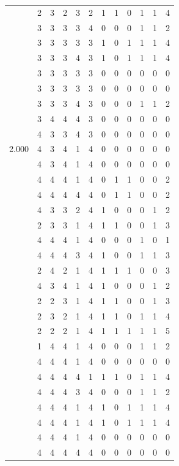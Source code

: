 \documentclass[]{msu-thesis}
\theoremstyle{definition}
\theoremstyle{definition}
\theoremstyle{definition}
\theoremstyle{remark}
\begin{document}
\begin{table}
{\begin{tabular}[t]{rrrrrrrrrrrr}
 & 2 & 3 & 2 & 3 & 2 & 1 & 1 & 0 & 1 & 1 & 4\\
 & 3 & 3 & 3 & 3 & 4 & 0 & 0 & 0 & 1 & 1 & 2\\
 & 3 & 3 & 3 & 3 & 3 & 1 & 0 & 1 & 1 & 1 & 4\\
 & 3 & 3 & 3 & 4 & 3 & 1 & 0 & 1 & 1 & 1 & 4\\
 & 3 & 3 & 3 & 3 & 3 & 0 & 0 & 0 & 0 & 0 & 0\\
 & 3 & 3 & 3 & 3 & 3 & 0 & 0 & 0 & 0 & 0 & 0\\
 & 3 & 3 & 3 & 4 & 3 & 0 & 0 & 0 & 1 & 1 & 2\\
 & 3 & 4 & 4 & 4 & 3 & 0 & 0 & 0 & 0 & 0 & 0\\
 & 4 & 3 & 3 & 4 & 3 & 0 & 0 & 0 & 0 & 0 & 0\\
2.000 & 4 & 3 & 4 & 1 & 4 & 0 & 0 & 0 & 0 & 0 & 0\\
 & 4 & 3 & 4 & 1 & 4 & 0 & 0 & 0 & 0 & 0 & 0\\
 & 4 & 4 & 4 & 1 & 4 & 0 & 1 & 1 & 0 & 0 & 2\\
 & 4 & 4 & 4 & 4 & 4 & 0 & 1 & 1 & 0 & 0 & 2\\
 & 4 & 3 & 3 & 2 & 4 & 1 & 0 & 0 & 0 & 1 & 2\\
 & 2 & 3 & 3 & 1 & 4 & 1 & 1 & 0 & 0 & 1 & 3\\
 & 4 & 4 & 4 & 1 & 4 & 0 & 0 & 0 & 1 & 0 & 1\\
 & 4 & 4 & 4 & 3 & 4 & 1 & 0 & 0 & 1 & 1 & 3\\
 & 2 & 4 & 2 & 1 & 4 & 1 & 1 & 1 & 0 & 0 & 3\\
 & 4 & 3 & 4 & 1 & 4 & 1 & 0 & 0 & 0 & 1 & 2\\
 & 2 & 2 & 3 & 1 & 4 & 1 & 1 & 0 & 0 & 1 & 3\\
 & 2 & 3 & 2 & 1 & 4 & 1 & 1 & 0 & 1 & 1 & 4\\
 & 2 & 2 & 2 & 1 & 4 & 1 & 1 & 1 & 1 & 1 & 5\\
 & 1 & 4 & 4 & 1 & 4 & 0 & 0 & 0 & 1 & 1 & 2\\
 & 4 & 4 & 4 & 1 & 4 & 0 & 0 & 0 & 0 & 0 & 0\\
 & 4 & 4 & 4 & 4 & 1 & 1 & 1 & 0 & 1 & 1 & 4\\
 & 4 & 4 & 4 & 3 & 4 & 0 & 0 & 0 & 1 & 1 & 2\\
 & 4 & 4 & 4 & 1 & 4 & 1 & 0 & 1 & 1 & 1 & 4\\
 & 4 & 4 & 4 & 1 & 4 & 1 & 0 & 1 & 1 & 1 & 4\\
 & 4 & 4 & 4 & 1 & 4 & 0 & 0 & 0 & 0 & 0 & 0\\
 & 4 & 4 & 4 & 4 & 4 & 0 & 0 & 0 & 0 & 0 & 0\\

\end{tabular}}
\end{table}
\end{document}
